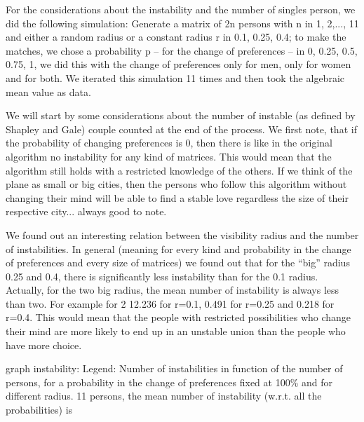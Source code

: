 \documentclass[11pt]{article}
\begin{document}
For the considerations about the instability and the number of singles person, we did the following 
simulation: Generate a matrix of 2n persons with n in {1, 2,..., 11} and either a random radius or a constant radius 
r in {0.1, 0.25, 0.4}; to make the matches, we chose a probability p -- for the change of preferences -- in 
{0, 0.25, 0.5, 0.75, 1}, we did this with the change of preferences only for men, only for women and 
for both. We iterated this simulation 11 times and then took the algebraic mean value as data.

We will start by some considerations about the number of instable (as defined by Shapley and Gale) 
couple counted at the end of the process.
We first note, that if the probability of changing preferences is 0, then there is like in the original 
algorithm no instability for any kind of matrices. This would mean that the algorithm still holds with a 
restricted knowledge of the others. If we think of the plane as small or big cities, then the persons 
who follow this algorithm without changing their mind will be able to find a stable love regardless the 
size of their respective city... always good to note.

We found out an interesting relation between the visibility radius and the number of instabilities. In 
general (meaning for every kind and probability in the change of preferences and every size of 
matrices) we found out that for the “big” radius 0.25 and 0.4, there is significantly less instability than 
for the 0.1 radius. Actually, for the two big radius, the mean number of instability is always less than 
two. For example for 2
12.236 for r=0.1, 0.491 for r=0.25 and 0.218 for r=0.4. This would mean that the people with 
restricted possibilities who change their mind are more likely to end up in an unstable union than the 
people who have more choice.

{graph instability: Legend: Number of instabilities in function of the number of persons, for a 
probability in the change of preferences fixed at 100\% and for different radius.}
11 persons, the mean number of instability (w.r.t. all the probabilities) is 
\end{document}
